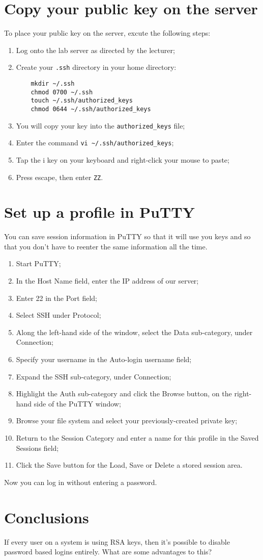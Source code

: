 \documentclass{article}
\begin{document}
\section{Copy your public key on the server}
To place your public key on the server, excute the following steps:

\begin{enumerate}
	\item Log onto the lab server as directed by the lecturer;
	\item Create your \texttt{.ssh} directory in your home directory:
	\begin{verbatim}
	mkdir ~/.ssh
	chmod 0700 ~/.ssh
	touch ~/.ssh/authorized_keys
	chmod 0644 ~/.ssh/authorized_keys
	\end{verbatim}
	\item You will copy your key into the \texttt{authorized\_keys} file;
	\item Enter the command \texttt{vi \textasciitilde/.ssh/authorized\_keys};
	\item Tap the i key on your keyboard and right-click your mouse to paste;
	\item Press escape, then enter \texttt{ZZ}.
\end{enumerate}

\section{Set up a profile in PuTTY}
You can save session information in PuTTY so that it will use you keys and so that you don't have to reenter the same information all the time.

\begin{enumerate}
	\item Start PuTTY;
	\item In the Host Name field, enter the IP address of our server; 
	\item Enter 22 in the Port field;
	\item Select SSH under Protocol;
	\item Along the left-hand side of the window, select the Data sub-category, under Connection;
	\item Specify your username in the Auto-login username field;
	\item Expand the SSH sub-category, under Connection;
	\item Highlight the Auth sub-category and click the Browse button, on the right-hand side of the PuTTY window;
	\item Browse your file system and select your previously-created private key;
	\item Return to the Session Category and enter a name for this profile in the Saved Sessions field;
	\item Click the Save button for the Load, Save or Delete a stored session area.
\end{enumerate}

Now you can log in without entering a password.

\section{Conclusions}
If every user on a system is using RSA keys, then it's possible to disable password based logins entirely.  What are some advantages to this?
\end{document}
